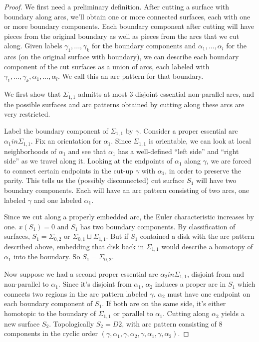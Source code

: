 \documentclass[12pt]{amsart}
\theoremstyle{definition}
\newcommand{\Si}{\Sigma}
\begin{document}
\begin{proof}

We first need a preliminary definition. After cutting a surface with boundary
along arcs, we'll obtain one or more connected surfaces, each with one or more
boundary components. Each boundary component after cutting will have pieces
from the original boundary as well as pieces from the arcs that we cut along.
Given labels $\gamma_1,...,\gamma_k$ for the boundary components and
$\alpha_1,...,\alpha_l$ for the arcs (on the original surface with boundary),
we can describe each boundary component of the cut surfaces as a union of arcs,
each labeled with $\gamma_1,...,\gamma_k,\alpha_1,...,\alpha_l$. We call this
an arc pattern for that boundary.

We first show that $\Si_{1,1}$ admitts at most 3 disjoint essential
non-parallel arcs, and the possible surfaces and arc patterns obtained by
cutting along these arcs are very restricted.

Label the boundary component of $\Si_{1,1}$ by $\gamma$. Consider a proper
essential arc $\alpha_1 in \Si_{1,1}$. Fix an orientation for $\alpha_1$. Since
$\Si_{1,1}$ is orientable, we can look at local neighborhoods of $\alpha_1$ and
see that $\alpha_1$ has a well-defined ``left side'' and ``right side'' as we
travel along it. Looking at the endpoints of $\alpha_1$ along $\gamma$, we are
forced to connect certain endpoints in the cut-up $\gamma$ with $\alpha_1$, in
order to preserve the parity. This tells us the (possibly disconnected) cut
surface $S_1$ will have two boundary components. Each will have an arc pattern
consisting of two arcs, one labeled $\gamma$ and one labeled $\alpha_1$.

Since we cut along a properly embedded arc, the Euler characteristic increases
by one. $x(S_1)=0$ and $S_1$ has two boundary components. By classification of
surfaces, $S_1 = \Si_{0,2}$ or $\Si_{0,1} \sqcup \Si_{1,1}$. But if $S_1$
contained a disk with the arc pattern described above, embedding that disk back
in $\Si_{1,1}$ would describe a homotopy of $\alpha_1$ into the boundary. So
$S_1 = \Si_{0,2}$.

Now suppose we had a second proper essential arc $\alpha_2 in \Si_{1,1}$,
disjoint from and non-parallel to $\alpha_1$. Since it's disjoint from
$\alpha_1$, $\alpha_2$ induces a proper arc in $S_1$ which connects two regions
in the arc pattern labeled $\gamma$.  $\alpha_2$ must have one endpoint on each
boundary component of $S_1$. If both are on the same side, it's either
homotopic to the boundary of $\Si_{1,1}$ or parallel to $\alpha_1$. Cutting
along $\alpha_2$ yields a new surface $S_2$. Topologically $S_2=D2$, with arc
pattern consisting of 8 components in the cyclic order
$(\gamma,\alpha_1,\gamma,\alpha_2,\gamma,\alpha_1,\gamma,\alpha_2)$.


\end{proof}
\end{document}
